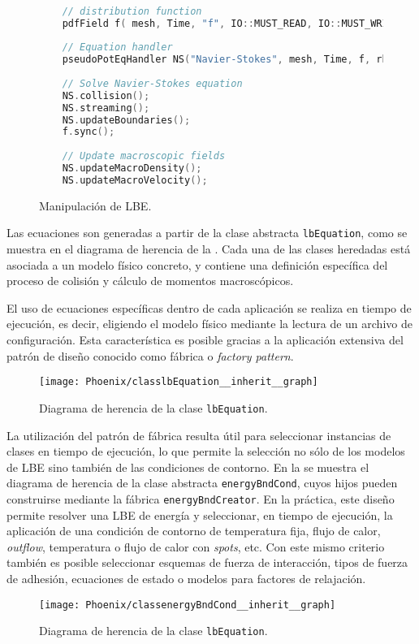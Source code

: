 \begin{figure}[ht]
	\centering
	\begin{lstlisting}[language=C++]

	// distribution function		
	pdfField f( mesh, Time, "f", IO::MUST_READ, IO::MUST_WRITE );	
	
	// Equation handler	
	pseudoPotEqHandler NS("Navier-Stokes", mesh, Time, f, rho, U, T);
	
	// Solve Navier-Stokes equation
	NS.collision();
	NS.streaming();
	NS.updateBoundaries();
	f.sync();
	
	// Update macroscopic fields
	NS.updateMacroDensity();
	NS.updateMacroVelocity();
	\end{lstlisting}
	\caption{Manipulaci\'on de LBE.}
	\label{fig:eq_handler}
\end{figure}

Las ecuaciones son generadas a partir de la clase abstracta \texttt{lbEquation}, como se muestra en el diagrama de herencia de la . Cada una de las clases heredadas est\'a asociada a un modelo f\'isico concreto, y contiene una definici\'on espec\'ifica del proceso de colisi\'on y c\'alculo de momentos macrosc\'opicos.

El uso de ecuaciones espec\'ificas dentro de cada aplicaci\'on se realiza en tiempo de ejecuci\'on, es decir, eligiendo el modelo f\'isico mediante la lectura de un archivo de configuraci\'on. Esta caracter\'istica es posible gracias a la aplicaci\'on extensiva del patr\'on de dise\~no conocido como f\'abrica o \emph{factory pattern}.

\begin{figure}[ht]
	\centering
	\texttt{[image: Phoenix/classlbEquation\_\_inherit\_\_graph]}
	\caption{Diagrama de herencia de la clase \texttt{lbEquation}.}
	\label{fig:lbeq_her}
\end{figure}

La utilizaci\'on del patr\'on de f\'abrica resulta \'util para seleccionar instancias de clases en tiempo de ejecuci\'on, lo que permite la selecci\'on no s\'olo de los modelos de LBE sino tambi\'en de las condiciones de contorno. En la  se muestra el diagrama de herencia de la clase abstracta \texttt{energyBndCond}, cuyos hijos pueden construirse mediante la f\'abrica \texttt{energyBndCreator}. En la pr\'actica, este dise\~no permite resolver una LBE de energ\'ia y seleccionar, en tiempo de ejecuci\'on, la aplicaci\'on de una condici\'on de contorno de temperatura fija, flujo de calor, \emph{outflow}, temperatura o flujo de calor con \emph{spots}, etc. Con este mismo criterio tambi\'en es posible seleccionar esquemas de fuerza de interacci\'on, tipos de fuerza de adhesi\'on, ecuaciones de estado o modelos para factores de relajaci\'on.

\begin{figure}[ht]
	\centering
	\texttt{[image: Phoenix/classenergyBndCond\_\_inherit\_\_graph]}
	\caption{Diagrama de herencia de la clase \texttt{lbEquation}.}
	\label{fig:energy_bnd}
\end{figure}